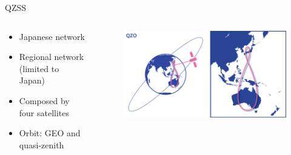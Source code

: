 \begin{frame}{QZSS}

    \begin{columns}[t]
        \begin{column}[t]{0.4\textwidth}
            \begin{itemize}
                \item Japanese network
                \vspace{0.2cm}
                \item Regional network (limited to Japan)
                \vspace{0.2cm}
                \item Composed by four satellites
                \vspace{0.2cm}
                \item Orbit: GEO and quasi-zenith
            \end{itemize}
        \end{column}
        \begin{column}[t]{0.6\textwidth}
            \begin{figure}[!ht]
                \begin{center}
                    \includegraphics[width=0.9\columnwidth]{figures/qzss-orbit}
                \end{center}
            \end{figure}
        \end{column}
    \end{columns}

\end{frame}

